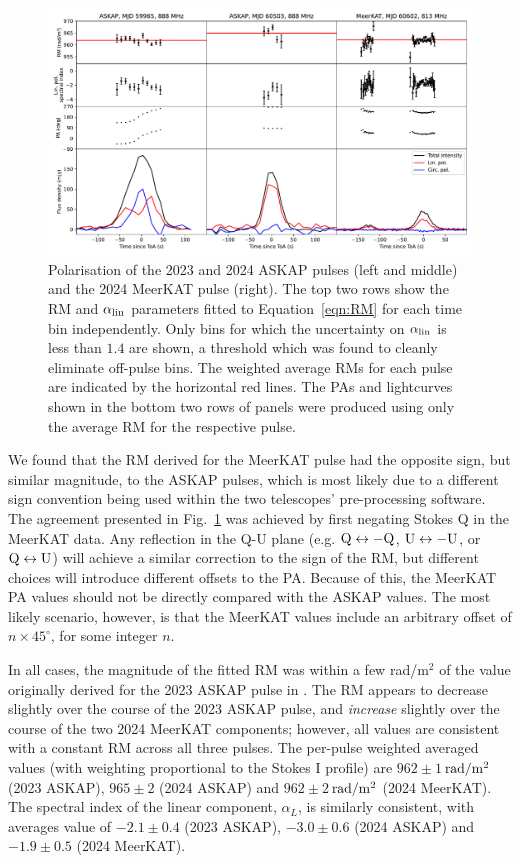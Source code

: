 \documentclass[fleqn,usenatbib]{mnras}
\newcommand{\Fig}{Fig.}
\newcommand{\Eqn}{Equation}
\begin{document}
\begin{figure}
    \centering
    \includegraphics[width=0.98\linewidth]{RM.pdf}
    \caption{Polarisation of the 2023 and 2024 ASKAP pulses (left and middle) and the 2024 MeerKAT pulse (right). The top two rows show the RM and $\alpha_{\rm lin}$ parameters fitted to \Eqn~\ref{eqn:RM} for each time bin independently. Only bins for which the uncertainty on $\alpha_{\rm lin}$ is less than $1.4$ are shown, a threshold which was found to cleanly eliminate off-pulse bins. The weighted average RMs for each pulse are indicated by the horizontal red lines. The PAs and lightcurves shown in the bottom two rows of panels were produced using only the average RM for the respective pulse.}
    \label{fig:RM}
\end{figure}

We found that the RM derived for the MeerKAT pulse had the opposite sign, but similar magnitude, to the ASKAP pulses, which is most likely due to a different sign convention being used within the two telescopes' pre-processing software.
The agreement presented in \Fig~\ref{fig:RM} was achieved by first negating Stokes Q in the MeerKAT data.
Any reflection in the Q-U plane (e.g. ${\rm Q} \leftrightarrow -{\rm Q}$, ${\rm U} \leftrightarrow -{\rm U}$, or ${\rm Q} \leftrightarrow {\rm U}$) will achieve a similar correction to the sign of the RM, but different choices will introduce different offsets to the PA.
Because of this, the MeerKAT PA values should not be directly compared with the ASKAP values.
The most likely scenario, however, is that the MeerKAT values include an arbitrary offset of $n \times 45^\circ$, for some integer $n$.

In all cases, the magnitude of the fitted RM was within a few rad/m$^2$ of the value originally derived for the 2023 ASKAP pulse in .
The RM appears to decrease slightly over the course of the 2023 ASKAP pulse, and \emph{increase} slightly over the course of the two 2024 MeerKAT components; however, all values are consistent with a constant RM across all three pulses.
The per-pulse weighted averaged values (with weighting proportional to the Stokes I profile) are $962 \pm 1$\,${\rm rad}/{\rm m}^2$ (2023 ASKAP), $965 \pm 2$ (2024 ASKAP) and $962 \pm 2$\,${\rm rad}/{\rm m}^2$ (2024 MeerKAT).
The spectral index of the linear component, $\alpha_L$, is similarly consistent, with averages value of $-2.1 \pm 0.4$ (2023 ASKAP), $-3.0 \pm 0.6$ (2024 ASKAP) and $-1.9 \pm 0.5$ (2024 MeerKAT).
\end{document}
